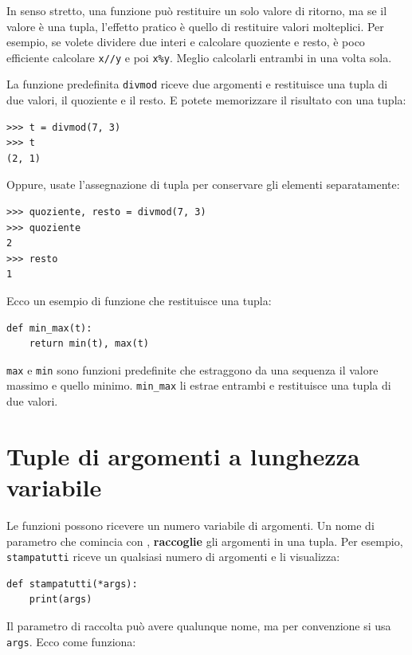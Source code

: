 \documentclass[10pt]{book}
\begin{document}
In senso stretto, una funzione può restituire un solo valore di ritorno, ma se il valore è una tupla, l'effetto pratico è quello di restituire valori molteplici. Per esempio, se volete dividere due interi e calcolare quoziente e resto, è poco efficiente calcolare {\tt x//y} e poi {\tt x\%y}.  Meglio calcolarli entrambi in una volta sola.

La funzione predefinita {\tt divmod} riceve due argomenti e restituisce una tupla di due valori, il quoziente e il resto. E potete memorizzare il risultato con una tupla:

\begin{verbatim}
>>> t = divmod(7, 3)
>>> t
(2, 1)
\end{verbatim}
%
Oppure, usate l'assegnazione di tupla per conservare gli elementi separatamente:

\begin{verbatim}
>>> quoziente, resto = divmod(7, 3)
>>> quoziente
2
>>> resto
1
\end{verbatim}
%
Ecco un esempio di funzione che restituisce una tupla:

\begin{verbatim}
def min_max(t):
    return min(t), max(t)
\end{verbatim}
%
{\tt max} e {\tt min} sono funzioni predefinite che estraggono da una sequenza il valore massimo e quello minimo.  \verb"min_max" li estrae entrambi e restituisce una tupla di due valori.


\section{Tuple di argomenti a lunghezza variabile}
\label{gather}

Le funzioni possono ricevere un numero variabile di argomenti. Un nome di parametro che comincia con {\tt *}, {\bf raccoglie} gli argomenti in una tupla. Per esempio, {\tt stampatutti} riceve un qualsiasi numero di argomenti e li visualizza:

\begin{verbatim}
def stampatutti(*args):
    print(args)
\end{verbatim}
%
Il parametro di raccolta può avere qualunque nome, ma per convenzione si usa {\tt args}. Ecco come funziona:
\end{document}

